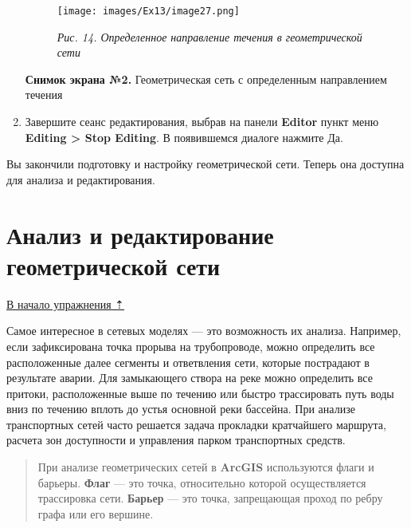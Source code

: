 \documentclass[12pt,]{book}
\begin{document}
\begin{enumerate}
  \begin{figure}
  \centering
  \texttt{[image: images/Ex13/image27.png]}
  \caption{\emph{Рис. 14. Определенное направление течения в геометрической сети}}
  \end{figure}

  \textbf{Снимок экрана №2.} Геометрическая сеть с определенным направлением течения
\item
  Завершите сеанс редактирования, выбрав на панели \textbf{Editor} пункт меню \textbf{Editing \textgreater{} Stop Editing}. В появившемся диалоге нажмите Да.
\end{enumerate}

Вы закончили подготовку и настройку геометрической сети. Теперь она доступна для анализа и редактирования.

\hypertarget{network-hydro-analysis}{%
\section{Анализ и редактирование геометрической сети}\label{network-hydro-analysis}}

\protect\hyperlink{network-hydro}{В начало упражнения ⇡}

Самое интересное в сетевых моделях --- это возможность их анализа. Например, если зафиксирована точка прорыва на трубопроводе, можно определить все расположенные далее сегменты и ответвления сети, которые пострадают в результате аварии. Для замыкающего створа на реке можно определить все притоки, расположенные выше по течению или быстро трассировать путь воды вниз по течению вплоть до устья основной реки бассейна. При анализе транспортных сетей часто решается задача прокладки кратчайшего маршрута, расчета зон доступности и управления парком транспортных средств.

\begin{quote}
При анализе геометрических сетей в \textbf{ArcGIS} используются флаги и барьеры. \textbf{Флаг} --- это точка, относительно которой осуществляется трассировка сети. \textbf{Барьер} --- это точка, запрещающая проход по ребру графа или его вершине.
\end{quote}
\end{document}
